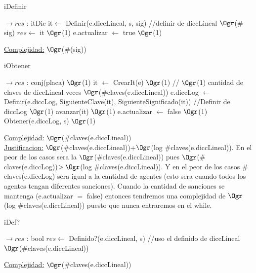 \begin{Representacion}
\begin{Algoritmos}
	\begin{algorithm}[H]
		\caption{iDefinir}
		\begin{algorithmic}[1]
			 $\to res$ : itDic
			\State it$\leftarrow$ Definir(e.diccLineal, s, sig) //definir de diccLineal \Comment $\Ogr$($\#$sig)
			\State $res \leftarrow$ it \Comment $\Ogr$(1)
			\State e.actualizar $\leftarrow$ true \Comment $\Ogr$(1) 
			\EndProcedure
		\end{algorithmic}
		\underline{Complejidad:} $\Ogr$($\#$(sig))
	\end{algorithm}

	\begin{algorithm}[H]
		\caption{iObtener}
		\begin{algorithmic}[1]
			 $\to res$ : conj(placa)
			 \Comment $\Ogr$(1)
				\State it $\leftarrow$ CrearIt(e) \Comment $\Ogr$(1)
				 // $\Ogr$(1) cantidad de claves de diccLineal veces \Comment $\Ogr$($\#$claves(e.diccLineal))
					\State e.diccLog $\leftarrow$ Definir(e.diccLog, SiguienteClave(it), SiguienteSignificado(it)) //Definir de diccLog \Comment $\Ogr$(1) 
					\State avanzar(it) \Comment $\Ogr$(1) 
				\EndWhile
				\State e.actualizar $\leftarrow$ false \Comment $\Ogr$(1) 
			\EndIf
			\State Obtener(e.diccLog, s) $\Ogr$(1)
			\EndProcedure
		\end{algorithmic}
		\underline{Complejidad:} $\Ogr$($\#$claves(e.diccLineal))
		\\
		\underline{Justificacion:} $\Ogr$($\#$claves(e.diccLineal))+$\Ogr$(log $\#$claves(e.diccLineal)). En el peor de los casos sera la $\Ogr$($\#$claves(e.diccLineal)) pues $\Ogr$($\#$claves(e.diccLog))$>\Ogr$(log $\#$claves(e.diccLineal)). Y en el peor de los casos $\#$claves(e.diccLog) sera igual a la cantidad de agentes (esto sera cuando todos los agentes tengan diferentes sanciones). Cuando la cantidad de sanciones se mantenga (e.actualizar $=$ false) entonces tendremos una complejidad de $\Ogr$(log $\#$claves(e.diccLineal)) puesto que nunca entraremos en el while.
	\end{algorithm}	
	
	\begin{algorithm}[H]
		\caption{iDef?}
		
		\begin{algorithmic}[1]
			 $\to res$ : bool
			\State $res \leftarrow$ Definido?(e.diccLineal, s) //uso el definido de diccLineal \Comment $\Ogr$($\#$claves(e.diccLineal))
			\EndProcedure
		\end{algorithmic}
		\underline{Complejidad:} $\Ogr$($\#$claves(e.diccLineal))
		
	\end{algorithm}

\end{Algoritmos}
\end{Representacion}